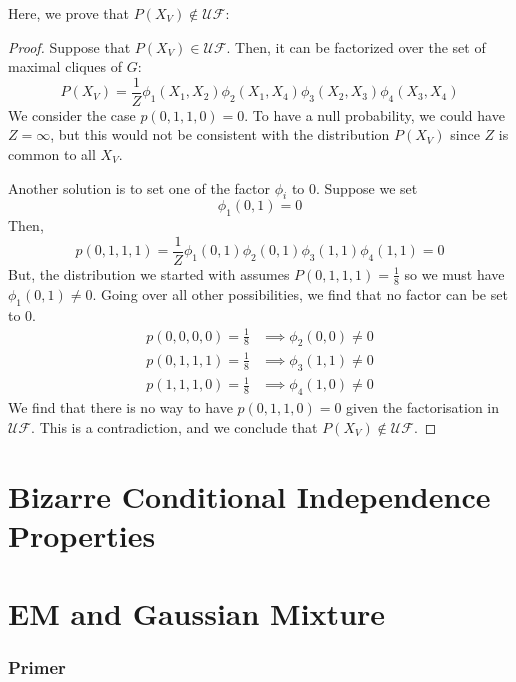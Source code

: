\documentclass{article}
\numberwithin{equation}{section}
\theoremstyle{named}
\begin{document}
Here, we prove that $P(X_V) \not\in \mathcal{UF}$:
\begin{proof}
        Suppose that $P(X_V) \in \mathcal{UF}$. Then, it can be factorized 
        over the set of maximal cliques of $G$:
        \[
                P(X_V) = \frac{1}{Z} \phi_1(X_1, X_2) \phi_2(X_1, X_4) 
                \phi_3(X_2, X_3) \phi_4(X_3, X_4)
        \]
        We consider the case $p(0, 1, 1, 0) = 0$. To have a null probability, 
        we could have $Z = \infty $, but this would not be consistent with 
        the distribution $P(X_V)$ since $Z$ is common to all $X_V$.

        Another solution is to set one of the factor $\phi_i$ to $0$. 
        Suppose we set 
        \[
                \phi_1(0, 1) = 0
        \]
        Then, 
        \[
                p(0, 1, 1, 1) = \frac{1}{Z}\phi_1(0, 1)\phi_2(0, 1) 
                \phi_3(1, 1) \phi_4(1, 1) = 0
        \]
        But, the distribution we started with assumes $P(0, 1, 1, 1) = \frac{1}{8}$ 
        so we must have $\phi_1(0, 1) \not= 0$. 
        Going over all other possibilities, we find that no factor can be 
        set to 0.
        \begin{align*}
                p(0, 0, 0, 0) = \frac{1}{8} &\implies \phi_2(0, 0) \not= 0\\
                p(0, 1, 1, 1) = \frac{1}{8} &\implies \phi_3(1, 1) \not= 0 \\
                p(1, 1, 1, 0) = \frac{1}{8} &\implies \phi_4(1, 0) \not= 0
        \end{align*}
        We find that there is no way to have $p(0, 1, 1, 0) = 0$ given the 
        factorisation in $\mathcal{UF}$.
        This is a contradiction, and we conclude that $P(X_V) \not\in \mathcal{UF}$.

\end{proof}





\section{Bizarre Conditional Independence Properties}

\section{EM and Gaussian Mixture}
\subsubsection{Primer}
\end{document}
